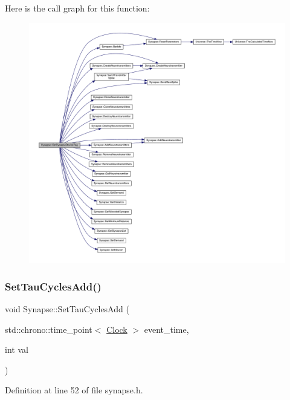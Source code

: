 Here is the call graph for this function\+:
\nopagebreak
\begin{figure}[H]
\begin{center}
\leavevmode
\includegraphics[width=350pt]{class_synapse_a702c08b1ee4389382a5890d8c19aee9c_cgraph}
\end{center}
\end{figure}
\mbox{\label{class_synapse_afbd7a2e7e6353b3e743ec100fe615e84}} 
\subsubsection{\texorpdfstring{Set\+Tau\+Cycles\+Add()}{SetTauCyclesAdd()}}
{\footnotesize\ttfamily void Synapse\+::\+Set\+Tau\+Cycles\+Add (\begin{DoxyParamCaption}\item[{std\+::chrono\+::time\+\_\+point$<$ \hyperlink{universe_8h_a0ef8d951d1ca5ab3cfaf7ab4c7a6fd80}{Clock} $>$}]{event\+\_\+time,  }\item[{int}]{val }\end{DoxyParamCaption})\hspace{0.3cm}{\ttfamily [inline]}}



Definition at line 52 of file synapse.\+h.

